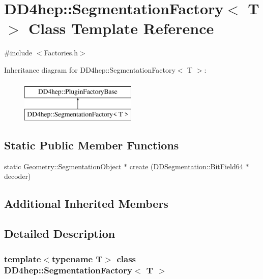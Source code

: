 \hypertarget{class_d_d4hep_1_1_segmentation_factory}{}\section{D\+D4hep\+:\+:Segmentation\+Factory$<$ T $>$ Class Template Reference}
\label{class_d_d4hep_1_1_segmentation_factory}


{\ttfamily \#include $<$Factories.\+h$>$}

Inheritance diagram for D\+D4hep\+:\+:Segmentation\+Factory$<$ T $>$\+:\begin{figure}[H]
\begin{center}
\leavevmode
\includegraphics[height=2.000000cm]{class_d_d4hep_1_1_segmentation_factory}
\end{center}
\end{figure}
\subsection*{Static Public Member Functions}
\begin{DoxyCompactItemize}
\item 
static \hyperlink{class_d_d4hep_1_1_geometry_1_1_segmentation_object}{Geometry\+::\+Segmentation\+Object} $\ast$ \hyperlink{class_d_d4hep_1_1_segmentation_factory_a57196e0678ec341aa3e0463334a723b4}{create} (\hyperlink{class_d_d4hep_1_1_d_d_segmentation_1_1_bit_field64}{D\+D\+Segmentation\+::\+Bit\+Field64} $\ast$decoder)
\end{DoxyCompactItemize}
\subsection*{Additional Inherited Members}


\subsection{Detailed Description}
\subsubsection*{template$<$typename T$>$\newline
class D\+D4hep\+::\+Segmentation\+Factory$<$ T $>$}



